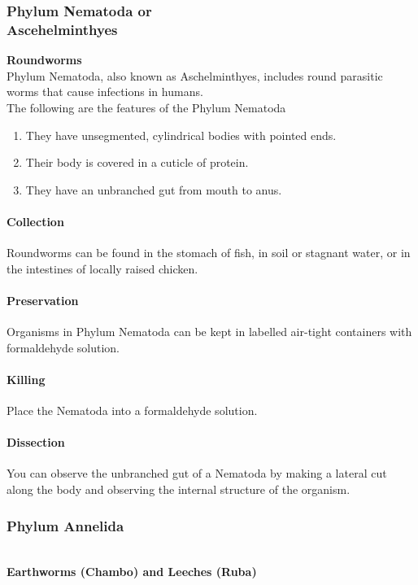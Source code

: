 \begin{multicols}{2}
\subsubsection{Phylum Nematoda or \hfill \\ Ascehelminthyes}
\textbf{Roundworms}\\
Phylum Nematoda, also known as Aschelminthyes, includes round parasitic worms that cause infections in humans.\\
The following are the features of the Phylum Nematoda 
\begin{enumerate}
\item{They have unsegmented, cylindrical bodies with pointed ends.}
\item{Their body is covered in a cuticle of protein.}
\item{They have an unbranched gut from mouth to anus.}
\end{enumerate}

\paragraph{Collection}
Roundworms can be found in the stomach of fish, in soil or stagnant water, or in the intestines of locally raised chicken.

\paragraph{Preservation} 
Organisms in Phylum Nematoda can be kept in labelled air-tight containers with formaldehyde solution.

\paragraph{Killing}
Place the Nematoda into a formaldehyde solution.

\paragraph{Dissection}
You can observe the unbranched gut of a Nematoda by making a lateral cut along the body and observing the internal structure of the organism.

\subsubsection{Phylum Annelida}\hfill \\
\textbf{Earthworms (Chambo) and Leeches (Ruba)}


\end{multicols}
